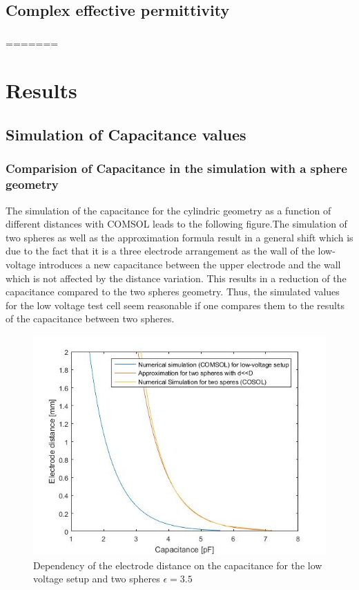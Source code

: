 \section{Complex effective permittivity}
\subsection{}
=======
\chapter{Results}
\section{Simulation of Capacitance values}
\subsection{Comparision of Capacitance in the simulation with a sphere geometry}
The simulation of the capacitance for the cylindric geometry as a function of different distances with COMSOL leads to the following figure.The simulation of two spheres as well as the approximation formula result in a general shift which is due to the fact that it is a three electrode arrangement as the wall of the low-voltage introduces a new capacitance between the upper electrode and the wall which is not affected by the distance variation. This results in a reduction of the capacitance compared to the two spheres geometry. Thus, the simulated values for the low voltage test cell seem reasonable if one compares them to the results of the capacitance between two spheres. \newline 


\begin{figure}[htbp]
	\centering
	\includegraphics[scale=0.3]{figures/Comparison_Low_voltage_Two_spheres}		
	\caption[Kurze Abbildungsbeschreibung]{Dependency of the electrode distance on the capacitance for the low voltage setup and two spheres $\epsilon = 3.5$ }%
	\label{fig.waveforms}
\end{figure}

